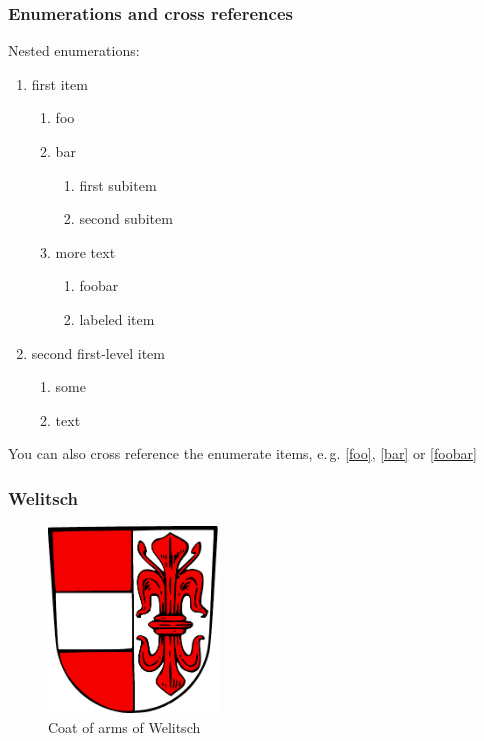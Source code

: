 \documentclass[12pt]{beamer}
\begin{document}
\begin{frame}
\frametitle{Enumerations and cross references}

Nested enumerations:

\begin{enumerate}
\item first item
\begin{enumerate}
\item foo
\item bar \label{bar}
\begin{enumerate}
\item first subitem
\item second subitem
\end{enumerate}
\item more text
\begin{enumerate}
\item foobar
\item labeled item \label{foobar}
\end{enumerate}
\end{enumerate}
\item second first-level item \label{foo}
\begin{enumerate}
\item some
\item text
\end{enumerate}
\end{enumerate}

You can also cross reference the enumerate items, e.\,g. \ref{foo}, \ref{bar} or \ref{foobar}

\end{frame}


\begin{frame}
\frametitle{Welitsch}

\begin{figure}
\centering
\includegraphics[width=0.4\textwidth]{welitsch_coat_of_arms}
\caption{
Coat of arms of Welitsch\cite{commons:welitsch}
}
\end{figure}
\end{frame}
\end{document}

